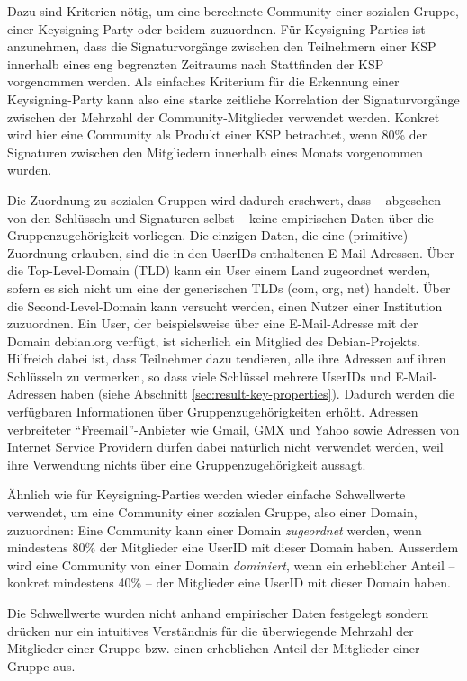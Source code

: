 Dazu sind Kriterien n\"otig, um eine berechnete Community einer
sozialen Gruppe, einer Keysigning-Party oder beidem zuzuordnen. F\"ur
Keysigning-Parties ist anzunehmen, dass die Signaturvorg\"ange
zwischen den Teilnehmern einer KSP innerhalb eines eng begrenzten
Zeitraums nach Stattfinden der KSP vorgenommen werden. Als einfaches
Kriterium f\"ur die Erkennung einer Keysigning-Party kann also eine
starke zeitliche Korrelation der Signaturvorg\"ange zwischen der
Mehrzahl der Community-Mitglieder verwendet werden. Konkret wird hier
eine Community als Produkt einer KSP betrachtet, wenn 80\% der
Signaturen zwischen den Mitgliedern innerhalb eines Monats vorgenommen
wurden.



Die Zuordnung zu sozialen Gruppen wird dadurch erschwert, dass --
abgesehen von den Schl\"usseln und Signaturen selbst -- keine
empirischen Daten \"uber die Gruppenzugeh\"origkeit vorliegen. Die
einzigen Daten, die eine (primitive) Zuordnung erlauben, sind die in
den UserIDs enthaltenen E-Mail-Adressen. \"Uber die Top-Level-Domain
(TLD) kann ein User einem Land zugeordnet werden, sofern es sich nicht
um eine der generischen TLDs (com, org, net) handelt. \"Uber die
Second-Level-Domain kann versucht werden, einen Nutzer einer
Institution zuzuordnen. Ein User, der beispielsweise \"uber eine
E-Mail-Adresse mit der Domain debian.org verf\"ugt, ist sicherlich ein
Mitglied des Debian-Projekts. Hilfreich dabei ist, dass Teilnehmer
dazu tendieren, alle ihre Adressen auf ihren Schl\"usseln zu
vermerken, so dass viele Schl\"ussel mehrere UserIDs und
E-Mail-Adressen haben (siehe Abschnitt
\ref{sec:result-key-properties}). Dadurch werden die verf\"ugbaren
Informationen \"uber Gruppenzugeh\"origkeiten erh\"oht. Adressen
verbreiteter ``Freemail''-Anbieter wie Gmail, GMX und Yahoo sowie
Adressen von Internet Service Providern d\"urfen dabei nat\"urlich
nicht verwendet werden, weil ihre Verwendung nichts \"uber eine
Gruppenzugeh\"origkeit aussagt.

\"Ahnlich wie f\"ur Keysigning-Parties werden wieder einfache
Schwellwerte verwendet, um eine Community einer sozialen Gruppe, also
einer Domain, zuzuordnen: Eine Community kann einer Domain
\emph{zugeordnet} werden, wenn mindestens 80\% der Mitglieder
eine UserID mit dieser Domain haben. Ausserdem wird eine Community von
einer Domain \emph{dominiert}, wenn ein erheblicher Anteil -- konkret
mindestens 40\% -- der Mitglieder eine UserID mit dieser Domain haben.

Die Schwellwerte wurden nicht anhand empirischer Daten festgelegt
sondern dr\"ucken nur ein intuitives Verst\"andnis f\"ur die
\"uberwiegende Mehrzahl der Mitglieder einer Gruppe bzw. einen
erheblichen Anteil der Mitglieder einer Gruppe aus.

